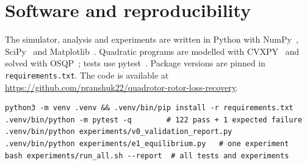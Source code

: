 \section{Software and reproducibility}\label{app:repro}
The simulator, analysis and experiments are written in Python with NumPy~\cite{harris2020numpy}, SciPy~\cite{virtanen2020scipy} and Matplotlib~\cite{hunter2007matplotlib}. Quadratic programs are modelled with CVXPY~\cite{diamond2016cvxpy} and solved with OSQP~\cite{stellato2020osqp}; tests use pytest~\cite{pytest}. Package versions are pinned in \texttt{requirements.txt}. The code is available at \url{https://github.com/pranshuk22/quadrotor-rotor-loss-recovery}.

\begin{verbatim}
python3 -m venv .venv && .venv/bin/pip install -r requirements.txt
.venv/bin/python -m pytest -q        # 122 pass + 1 expected failure
.venv/bin/python experiments/v0_validation_report.py
.venv/bin/python experiments/e1_equilibrium.py   # one experiment
bash experiments/run_all.sh --report  # all tests and experiments
\end{verbatim}

